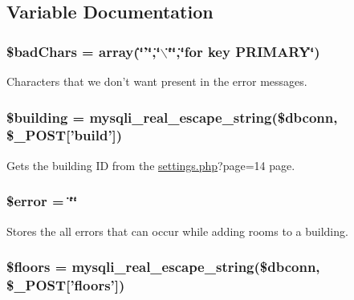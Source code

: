 \subsection{\-Variable \-Documentation}
\hypertarget{roomsVal_8php_a2cca3c3b2bea27a3104265f7cc345bcb}{
\subsubsection[{\$bad\-Chars}]{\setlength{\rightskip}{0pt plus 5cm}\$bad\-Chars = array(\char`\"{}'\char`\"{},\char`\"{}$\backslash$\char`\"{}\char`\"{},\char`\"{}{\bf for} key \-P\-R\-I\-M\-A\-R\-Y\char`\"{})}}\label{roomsVal_8php_a2cca3c3b2bea27a3104265f7cc345bcb}
\-Characters that we don't want present in the error messages. \hypertarget{roomsVal_8php_a903ab1c50249715a442ce81e6d5ba775}{
\subsubsection[{\$building}]{\setlength{\rightskip}{0pt plus 5cm}\$building = mysqli\-\_\-real\-\_\-escape\-\_\-string(\$dbconn, \$\-\_\-\-P\-O\-S\-T\mbox{[}'build'\mbox{]})}}\label{roomsVal_8php_a903ab1c50249715a442ce81e6d5ba775}
\-Gets the building \-I\-D from the \hyperlink{settings_8php}{settings.\-php}?page=14 page. \hypertarget{roomsVal_8php_aeba2ab722cedda53dbb7ec1a59f45550}{
\subsubsection[{\$error}]{\setlength{\rightskip}{0pt plus 5cm}\$error = \char`\"{}\char`\"{}}}\label{roomsVal_8php_aeba2ab722cedda53dbb7ec1a59f45550}
\-Stores the all errors that can occur while adding rooms to a building. \hypertarget{roomsVal_8php_aa0d74edae4412a4ad5a1b0537ada5ecc}{
\subsubsection[{\$floors}]{\setlength{\rightskip}{0pt plus 5cm}\$floors = mysqli\-\_\-real\-\_\-escape\-\_\-string(\$dbconn, \$\-\_\-\-P\-O\-S\-T\mbox{[}'floors'\mbox{]})}}\label{roomsVal_8php_aa0d74edae4412a4ad5a1b0537ada5ecc}
